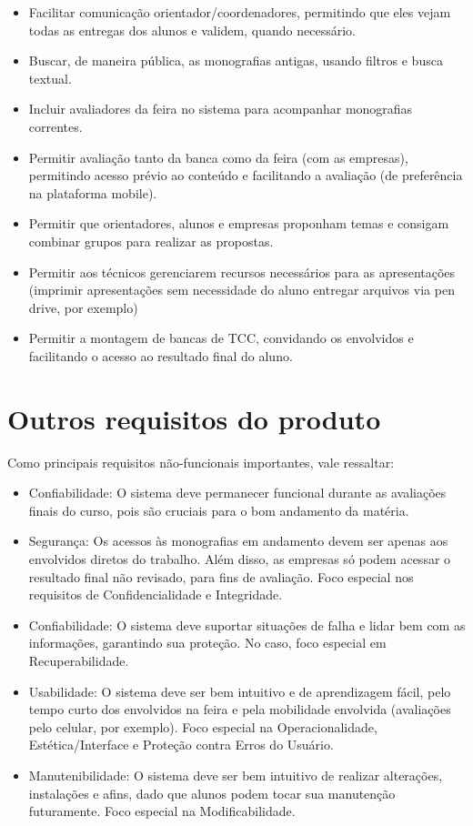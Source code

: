 \begin{itemize}
    \item Facilitar comunicação orientador/coordenadores, permitindo que eles vejam todas as entregas dos alunos e validem, quando necessário.
    \item Buscar, de maneira pública, as monografias antigas, usando filtros e busca textual.
    \item Incluir avaliadores da feira no sistema para acompanhar monografias correntes.
    \item Permitir avaliação tanto da banca como da feira (com as empresas), permitindo acesso prévio ao conteúdo e facilitando a avaliação (de preferência na plataforma mobile).
    \item Permitir que orientadores, alunos e empresas proponham temas e consigam combinar grupos para realizar as propostas.
    \item Permitir aos técnicos gerenciarem recursos necessários para as apresentações (imprimir apresentações sem necessidade do aluno entregar arquivos via pen drive, por exemplo)
    \item Permitir a montagem de bancas de TCC, convidando os envolvidos e facilitando o acesso ao resultado final do aluno.
\end{itemize}
  
\section{Outros requisitos do produto}
Como principais requisitos não-funcionais importantes, vale ressaltar:

\begin{itemize}
    \item Confiabilidade: O sistema deve permanecer funcional durante as avaliações finais do curso, pois são cruciais para o bom andamento da matéria.
    \item Segurança: Os acessos às monografias em andamento devem ser apenas aos envolvidos diretos do trabalho. Além disso, as empresas só podem acessar o resultado final não revisado, para fins de avaliação. Foco especial nos requisitos de Confidencialidade e Integridade.
    \item Confiabilidade: O sistema deve suportar situações de falha e lidar bem com as informações, garantindo sua proteção. No caso, foco especial em Recuperabilidade.
    \item Usabilidade: O sistema deve ser bem intuitivo e de aprendizagem fácil, pelo tempo curto dos envolvidos na feira e pela mobilidade envolvida (avaliações pelo celular, por exemplo). Foco especial na Operacionalidade, Estética/Interface e Proteção contra Erros do Usuário.
    \item Manutenibilidade: O sistema deve ser bem intuitivo de realizar alterações, instalações e afins, dado que alunos podem tocar sua manutenção futuramente. Foco especial na Modificabilidade.
\end{itemize}
